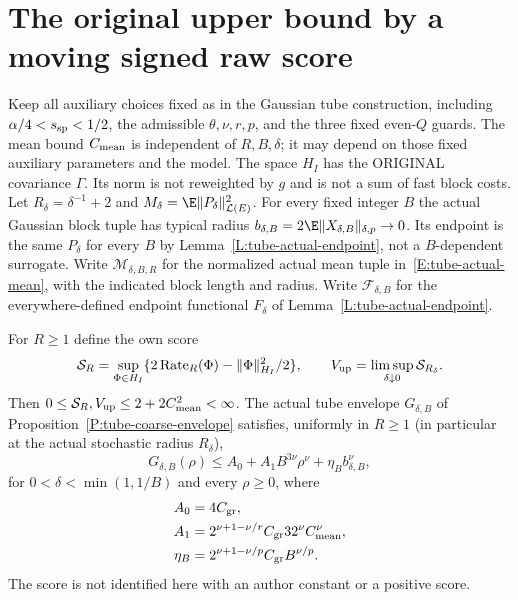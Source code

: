 \section{The original upper bound by a moving signed raw score}
\label{S:original-signed-score-upper}

Keep all auxiliary choices fixed as in the Gaussian tube construction,
including $\alpha/4<s_{\rm sp}<1/2$, the admissible $\theta,\nu,r,p$,
and the three fixed even-$Q$ guards.
The mean bound $C_{\rm mean}$ is independent of $R,B,\delta$;
it may depend on those fixed auxiliary parameters and the model.
The space $H_I$ has the ORIGINAL covariance $\Gamma$.
Its norm is not reweighted by $g$ and is not a sum of fast block costs.
Let $R_\delta=\delta^{-1}+2$ and
$M_\delta=\E\|P_\delta\|_{\mathcal L(E)}^2$.
For every fixed integer $B$ the actual Gaussian block tuple has typical
radius $b_{\delta,B}=2\E\|X_{\delta,B}\|_{\delta,p}\to0$.
Its endpoint is the same $P_\delta$ for every $B$ by
Lemma~\ref{L:tube-actual-endpoint}, not a $B$-dependent surrogate.
Write $\mathcal M_{\delta,B,R}$ for the normalized actual mean tuple
in~\eqref{E:tube-actual-mean}, with the indicated block length and radius.
Write $\mathcal F_{\delta,B}$ for the everywhere-defined endpoint
functional $F_\delta$ of Lemma~\ref{L:tube-actual-endpoint}.

\begin{lemma}
  \label{L:signed-score-envelope}
  For $R\ge1$ define the own score
  \begin{equation}\label{E:signed-raw-score}
    \mathcal S_R=\sup_{\Phi\in H_I}
    \{2\operatorname{Rate}_R(\Phi)-\|\Phi\|_{H_I}^2/2\},
    \qquad V_{\rm up}=\limsup_{\delta\downarrow0}\mathcal S_{R_\delta}.
  \end{equation}
  Then $0\le\mathcal S_R,V_{\rm up}\le2+2C_{\rm mean}^2<\infty$.
  The actual tube envelope $G_{\delta,B}$ of
  Proposition~\ref{P:tube-coarse-envelope} satisfies, uniformly in
  $R\ge1$ (in particular at the actual stochastic radius $R_\delta$),
  \begin{equation}\label{E:signed-polynomial-envelope}
    G_{\delta,B}(\rho)\le A_0+A_1B^{3\nu}\rho^\nu
    +\eta_B b_{\delta,B}^\nu ,
  \end{equation}
  for $0<\delta<\min(1,1/B)$ and every $\rho\ge0$, where
  \[
    \begin{aligned}
      A_0&=4C_{\rm gr},\\
      A_1&=2^{\nu+1-\nu/r}C_{\rm gr}32^\nu C_{\rm mean}^\nu,\\
      \eta_B&=2^{\nu+1-\nu/p}C_{\rm gr}B^{\nu/p}.
    \end{aligned}
  \]
  The score is not identified here with an author constant or a positive score.
\end{lemma}

